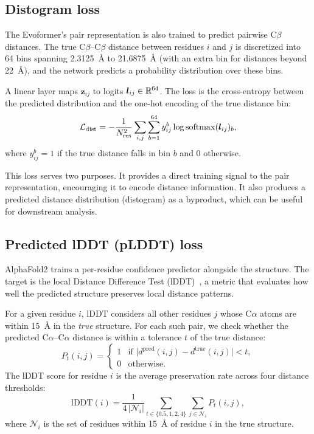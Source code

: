 \subsection*{Distogram loss}
\label{sec:af2-distogram}

The Evoformer's pair representation is also trained to predict pairwise C$\beta$ distances.
The true C$\beta$--C$\beta$ distance between residues $i$ and $j$ is discretized into 64 bins spanning 2.3125~\AA{} to 21.6875~\AA{} (with an extra bin for distances beyond 22~\AA{}), and the network predicts a probability distribution over these bins.

A linear layer maps $\bm{z}_{ij}$ to logits $\bm{l}_{ij} \in \mathbb{R}^{64}$.
The loss is the cross-entropy between the predicted distribution and the one-hot encoding of the true distance bin:
\begin{equation}
\label{eq:distogram-loss}
\mathcal{L}_\text{dist} = -\frac{1}{N_\text{res}^2} \sum_{i,j} \sum_{b=1}^{64} y_{ij}^b \log \operatorname{softmax}(\bm{l}_{ij})_b,
\end{equation}
where $y_{ij}^b = 1$ if the true distance falls in bin $b$ and 0 otherwise.

This loss serves two purposes.
It provides a direct training signal to the pair representation, encouraging it to encode distance information.
It also produces a predicted distance distribution (distogram) as a byproduct, which can be useful for downstream analysis.

\subsection*{Predicted lDDT (pLDDT) loss}
\label{sec:af2-plddt-loss}

AlphaFold2 trains a per-residue confidence predictor alongside the structure.
The target is the local Distance Difference Test (lDDT)~\cite{mariani2013}, a metric that evaluates how well the predicted structure preserves local distance patterns.

For a given residue $i$, lDDT considers all other residues $j$ whose C$\alpha$ atoms are within 15~\AA{} in the \emph{true} structure.
For each such pair, we check whether the predicted C$\alpha$--C$\alpha$ distance is within a tolerance $t$ of the true distance:
\begin{equation}
\label{eq:lddt-preserved}
P_t(i,j) = \begin{cases} 1 & \text{if } \bigl|d^\text{pred}(i,j) - d^\text{true}(i,j)\bigr| < t, \\ 0 & \text{otherwise}. \end{cases}
\end{equation}
The lDDT score for residue $i$ is the average preservation rate across four distance thresholds:
\begin{equation}
\label{eq:lddt-per-residue}
\text{lDDT}(i) = \frac{1}{4 \,|\mathcal{N}_i|} \sum_{t \in \{0.5, 1, 2, 4\}} \sum_{j \in \mathcal{N}_i} P_t(i,j),
\end{equation}
where $\mathcal{N}_i$ is the set of residues within 15~\AA{} of residue $i$ in the true structure.


